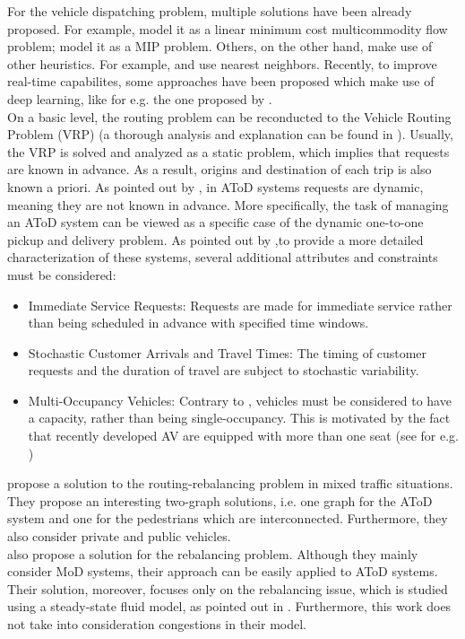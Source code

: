 For the vehicle dispatching problem, multiple solutions have been already proposed. For example,  model it as a linear minimum cost multicommodity flow problem;  model it as a MIP problem. Others, on the other hand, make use of other heuristics. For example,  and  use nearest neighbors. Recently, to improve real-time capabilites, some approaches have been proposed which make use of deep learning, like for e.g. the one proposed by .\\
On a basic level, the routing problem can be reconducted to the Vehicle Routing Problem (VRP) (a thorough analysis and explanation can be found in \cite{doi:10.1137/1.9780898718515}). Usually, the VRP is solved and analyzed as a static problem, which implies that requests are known in advance. As a result, origins and destination of each trip is also known a priori. As pointed out by , in AToD systems requests are dynamic, meaning they are not known in advance. More specifically, the task of managing an AToD system can be viewed as a specific case of the dynamic one-to-one pickup and delivery problem. As pointed out by ,to provide a more detailed characterization of these systems, several additional attributes and constraints must be considered:
\begin{itemize}
	\item Immediate Service Requests: Requests are made for immediate service rather than being scheduled in advance with specified time windows.
	\item Stochastic Customer Arrivals and Travel Times: The timing of customer requests and the duration of travel are subject to stochastic variability.
	\item Multi-Occupancy Vehicles: Contrary to \cite{zhang2016}, vehicles must be considered to have a capacity, rather than being single-occupancy. This is motivated by the fact that recently developed AV are equipped with more than one seat (see for e.g. \cite{dlr-nemo-bili})
\end{itemize}

 propose a solution to the routing-rebalancing problem in mixed traffic situations. They propose an interesting two-graph solutions, i.e. one graph for the AToD system and one for the pedestrians which are interconnected. Furthermore, they also consider private and public vehicles. \\
 also propose a solution for the rebalancing problem. Although they mainly consider MoD systems, their approach can be easily applied to AToD systems. Their solution, moreover, focuses only on the rebalancing issue, which is studied using a steady-state fluid model, as pointed out in \cite{9294258}. Furthermore, this work does not take into consideration congestions in their model. 


